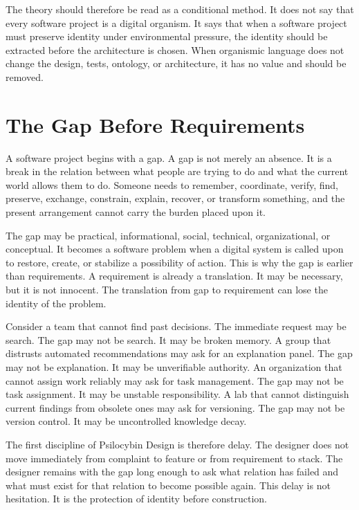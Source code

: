 \documentclass[11pt]{article}
\begin{document}
The theory should therefore be read as a conditional method. It does not say that every software project is a digital organism. It says that when a software project must preserve identity under environmental pressure, the identity should be extracted before the architecture is chosen. When organismic language does not change the design, tests, ontology, or architecture, it has no value and should be removed.

\section{The Gap Before Requirements}

A software project begins with a gap. A gap is not merely an absence. It is a break in the relation between what people are trying to do and what the current world allows them to do. Someone needs to remember, coordinate, verify, find, preserve, exchange, constrain, explain, recover, or transform something, and the present arrangement cannot carry the burden placed upon it.

The gap may be practical, informational, social, technical, organizational, or conceptual. It becomes a software problem when a digital system is called upon to restore, create, or stabilize a possibility of action. This is why the gap is earlier than requirements. A requirement is already a translation. It may be necessary, but it is not innocent. The translation from gap to requirement can lose the identity of the problem.

Consider a team that cannot find past decisions. The immediate request may be search. The gap may not be search. It may be broken memory. A group that distrusts automated recommendations may ask for an explanation panel. The gap may not be explanation. It may be unverifiable authority. An organization that cannot assign work reliably may ask for task management. The gap may not be task assignment. It may be unstable responsibility. A lab that cannot distinguish current findings from obsolete ones may ask for versioning. The gap may not be version control. It may be uncontrolled knowledge decay.

The first discipline of Psilocybin Design is therefore delay. The designer does not move immediately from complaint to feature or from requirement to stack. The designer remains with the gap long enough to ask what relation has failed and what must exist for that relation to become possible again. This delay is not hesitation. It is the protection of identity before construction.
\end{document}
